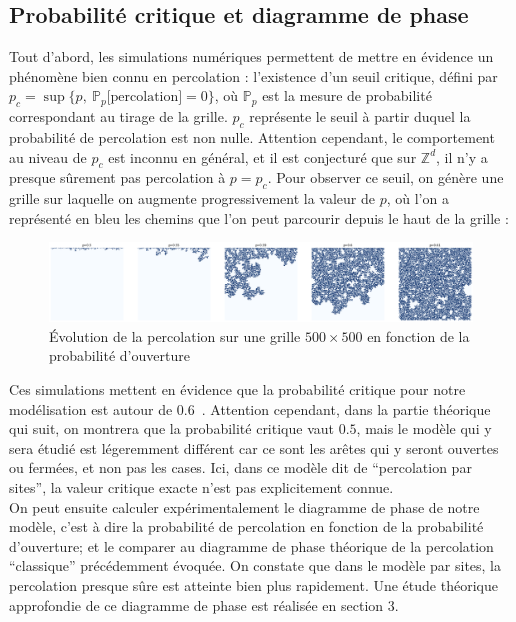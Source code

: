 \documentclass[11pt,a4paper]{article}
\begin{document}
\subsection{Probabilité critique et diagramme de phase}

Tout d'abord, les simulations numériques permettent de mettre en évidence un phénomène bien connu en percolation : l'existence d'un seuil critique, défini par $p_c = \sup{ \{p, \ \mathbb{P}_p[\text{percolation]}=0 \} }$, où $ \mathbb{P}_p$ est la mesure de probabilité correspondant au tirage de la grille. $p_c$ représente le seuil à partir duquel la probabilité de percolation est non nulle. Attention cependant, le comportement au niveau de $p_c$ est inconnu en général, et il est conjecturé que sur $\mathbb{Z}^d$, il n'y a presque sûrement pas percolation à $p=p_c$. Pour observer ce seuil, on génère une grille sur laquelle on augmente progressivement la valeur de $p$, où l'on a représenté en bleu les chemins que l'on peut parcourir depuis le haut de la grille : 

\begin{figure}[htbp]
    \centering
    \includegraphics[width=1 \textwidth]{./Pictures/evolution.png}
    \caption{Évolution de la percolation sur une grille $500\times 500$ en fonction de la probabilité d'ouverture}
    \label{fig:evol}
\end{figure}

Ces simulations mettent en évidence que la probabilité critique pour notre modélisation est autour de $0.6$\ . Attention cependant, dans la partie théorique qui suit, on montrera que la probabilité critique vaut $0.5$, mais le modèle qui y sera étudié est légeremment différent car ce sont les arêtes qui y seront ouvertes ou fermées, et non pas les cases. Ici, dans ce modèle dit de ``percolation par sites'', la valeur critique exacte n'est pas explicitement connue. \\

On peut ensuite calculer expérimentalement le diagramme de phase de notre modèle, c'est à dire la probabilité de percolation en fonction de la probabilité d'ouverture; et le comparer au diagramme de phase théorique de la percolation ``classique'' précédemment évoquée. On constate que dans le modèle par sites, la percolation presque sûre est atteinte bien plus rapidement. Une étude théorique approfondie de ce diagramme de phase est réalisée en section $3$.
\end{document}
